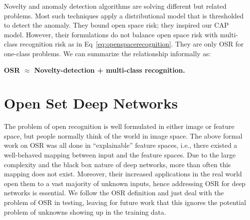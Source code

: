 \documentclass[letterpaper]{article}
\begin{document}
Novelty and  anomaly detection algorithms \cite{bodesheim_local_2015,lazzaretti_novelty_2016,schultheiss_finding_2017,bansal2018coverage} are solving different but related problems.  Most such techniques apply a distributional model that is thresholded to detect the anomaly. They bound open space risk;  they inspired our CAP model.   However, their formulations do not balance open space risk with multi-class recognition risk as in Eq~\ref{eq:openspacerecognition}.   They are only OSR for one-class problems.   We can summarize the relationship informally as:\\ \centerline{\bf OSR $\approx$  Novelty-detection + multi-class recognition.}



\section{Open Set  Deep Networks}

The problem of open recognition is well formulated in either image or feature space, but people normally think of the world in image space.  The above formal work on OSR was all done in ``explainable” feature spaces, i.e., there existed a well-behaved mapping between input and the feature spaces.   
Due to the large complexity and the black box nature of deep networks, more than often this mapping does not exist.
Moreover, their increased applications in the real world open them to a vast majority of unknown inputs, hence addressing OSR for deep networks is essential.
We follow the OSR definition and just deal with the problem of OSR in testing, leaving for future work that this ignores the potential problem of unknowns showing up in the training data. 
\end{document}
